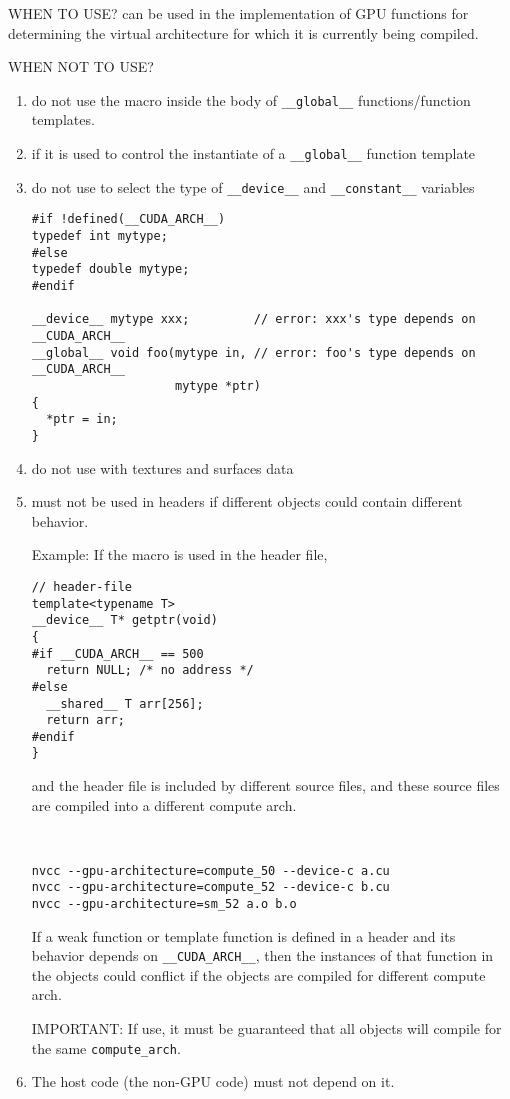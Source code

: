WHEN TO USE?  can be used in the implementation of GPU functions for determining
the virtual architecture for which it is currently being compiled.


WHEN NOT TO USE? 
\begin{enumerate}
  \item do not use the macro inside the body of \verb!__global__! functions/function templates.
  
  \item if it is used to control the instantiate of a \verb!__global__! function template
  
  \item do not use to select the type of \verb!__device__! and \verb!__constant__! variables
  
\begin{lstlisting}
#if !defined(__CUDA_ARCH__)
typedef int mytype;
#else
typedef double mytype;
#endif

__device__ mytype xxx;         // error: xxx's type depends on __CUDA_ARCH__
__global__ void foo(mytype in, // error: foo's type depends on __CUDA_ARCH__
                    mytype *ptr)
{
  *ptr = in;
}
\end{lstlisting}  

  \item do not use with textures and surfaces data

    
  \item  must not be used in headers if different objects could contain different behavior.
  
  Example: If the macro is used in the header file, 
\begin{lstlisting}
// header-file
template<typename T>
__device__ T* getptr(void)
{
#if __CUDA_ARCH__ == 500
  return NULL; /* no address */
#else
  __shared__ T arr[256];
  return arr;
#endif
}
\end{lstlisting} 
  and the header file is
  included by different source files, and these source files are compiled into a different compute arch.
\begin{verbatim}


nvcc --gpu-architecture=compute_50 --device-c a.cu
nvcc --gpu-architecture=compute_52 --device-c b.cu
nvcc --gpu-architecture=sm_52 a.o b.o
\end{verbatim}
  If a weak function or template function is defined in a header and its
  behavior depends on \verb!__CUDA_ARCH__!, then the instances of that function in the
  objects could conflict if the objects are compiled for different compute arch.
  
  IMPORTANT: If use, it must be guaranteed that all objects will compile for the
  same \verb!compute_arch!.
  
  
  
  \item The host code (the non-GPU code) must not depend on it.
\end{enumerate}

